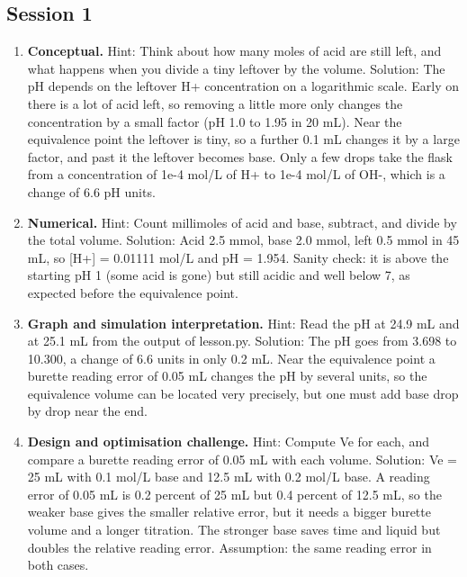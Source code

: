 \documentclass[11pt,a4paper]{article}
\begin{document}
\subsection*{Session 1}
\begin{enumerate}[nosep]
\item \textbf{Conceptual.} Hint: Think about how many moles of acid are still left, and what happens when you divide a tiny leftover by the volume. Solution: The pH depends on the leftover H+ concentration on a logarithmic scale. Early on there is a lot of acid left, so removing a little more only changes the concentration by a small factor (pH 1.0 to 1.95 in 20 mL). Near the equivalence point the leftover is tiny, so a further 0.1 mL changes it by a large factor, and past it the leftover becomes base. Only a few drops take the flask from a concentration of 1e-4 mol/L of H+ to 1e-4 mol/L of OH-, which is a change of 6.6 pH units.
\item \textbf{Numerical.} Hint: Count millimoles of acid and base, subtract, and divide by the total volume. Solution: Acid 2.5 mmol, base 2.0 mmol, left 0.5 mmol in 45 mL, so [H+] = 0.01111 mol/L and pH = 1.954. Sanity check: it is above the starting pH 1 (some acid is gone) but still acidic and well below 7, as expected before the equivalence point.
\item \textbf{Graph and simulation interpretation.} Hint: Read the pH at 24.9 mL and at 25.1 mL from the output of lesson.py. Solution: The pH goes from 3.698 to 10.300, a change of 6.6 units in only 0.2 mL. Near the equivalence point a burette reading error of 0.05 mL changes the pH by several units, so the equivalence volume can be located very precisely, but one must add base drop by drop near the end.
\item \textbf{Design and optimisation challenge.} Hint: Compute Ve for each, and compare a burette reading error of 0.05 mL with each volume. Solution: Ve = 25 mL with 0.1 mol/L base and 12.5 mL with 0.2 mol/L base. A reading error of 0.05 mL is 0.2 percent of 25 mL but 0.4 percent of 12.5 mL, so the weaker base gives the smaller relative error, but it needs a bigger burette volume and a longer titration. The stronger base saves time and liquid but doubles the relative reading error. Assumption: the same reading error in both cases.
\end{enumerate}
\end{document}
